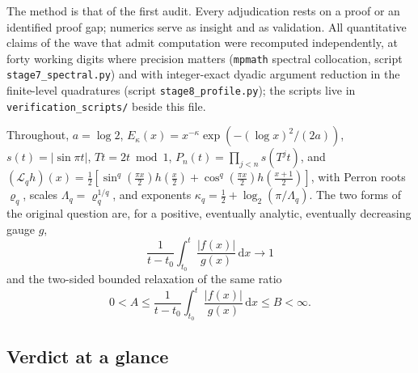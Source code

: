 \documentclass[11pt,oneside]{article}
\theoremstyle{definition}
\theoremstyle{remark}
\newcommand{\dd}{\,\mathrm d}
\newcommand{\T}{T}
\newcommand{\Lop}{\mathcal L}
\begin{document}
The method is that of the first audit.  Every adjudication rests on a
proof or an identified proof gap; numerics serve as insight and as
validation.  All quantitative claims of the wave that admit computation
were recomputed independently, at forty working digits where precision
matters (\texttt{mpmath} spectral collocation, script
\nolinkurl{stage7_spectral.py}) and with integer-exact dyadic argument
reduction in the finite-level quadratures (script
\nolinkurl{stage8_profile.py}); the scripts live in
\nolinkurl{verification_scripts/} beside this file.

Throughout, $a=\log 2$,
$E_\kappa(x)=x^{-\kappa}\exp(-(\log x)^2/(2a))$,
$s(t)=|\sin\pi t|$, $\T t=2t\bmod 1$,
$P_n(t)=\prod_{j<n}s(\T^jt)$, and
$(\Lop_qh)(x)=\frac12[\sin^q(\tfrac{\pi x}2)h(\tfrac x2)+
\cos^q(\tfrac{\pi x}2)h(\tfrac{x+1}2)]$, with Perron roots $\varrho_q$,
scales $\Lambda_q=\varrho_q^{1/q}$, and exponents
$\kappa_q=\frac12+\log_2(\pi/\Lambda_q)$.  The two forms of the original
question \cite{mse-decay} are, for a positive, eventually analytic,
eventually decreasing gauge $g$,
\begin{equation}
 \frac1{t-t_0}\int_{t_0}^t\frac{|f(x)|}{g(x)}\dd x\longrightarrow1
 \tag{Q2}\label{eq:Q2}
\end{equation}
and the two-sided bounded relaxation of the same ratio
\begin{equation}
 0<A\le\frac1{t-t_0}\int_{t_0}^t\frac{|f(x)|}{g(x)}\dd x\le B<\infty.
 \tag{Q3}\label{eq:Q3}
\end{equation}

\subsection*{Verdict at a glance}
\end{document}

